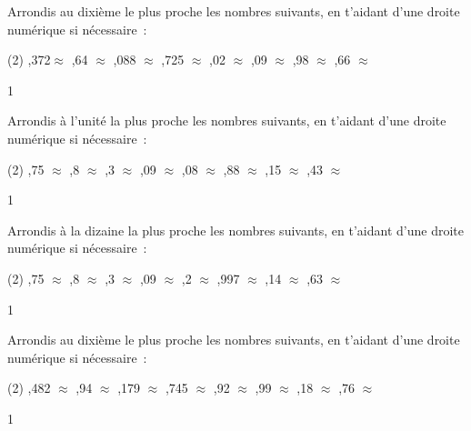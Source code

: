 \documentclass[a4paper,11pt]{report}
\begin{document}
\begin{exop}{
Arrondis au dixième le plus proche les nombres suivants, en t'aidant d'une droite numérique si nécessaire~:
\begin{tasks}[after-item-skip = 0.2em, after-skip=-1.5em](2)
\bigskip{},372$\approx$ \hrulefill 
\bigskip{},64 $\approx$\hrulefill 
\bigskip{},088 $\approx$\hrulefill 
\bigskip{},725 $\approx$ \hrulefill 
\bigskip{},02 $\approx$ \hrulefill
\bigskip{},09 $\approx$ \hrulefill 
\bigskip{},98 $\approx$ \hrulefill 
\bigskip{},66 $\approx$ \hrulefill 
\end{tasks}
}{1}\end{exop}


\begin{exop}{
Arrondis à l'unité la plus proche les nombres suivants, en t'aidant d'une droite numérique si nécessaire~:
\begin{tasks}[after-item-skip = 0.2em, after-skip=-1.5em](2)
\bigskip{},75 $\approx$\hrulefill  
\bigskip{},8 $\approx$ \hrulefill  
\bigskip{},3 $\approx$ \hrulefill  
\bigskip{},09 $\approx$\hrulefill  
\bigskip{},08 $\approx$\hrulefill  
\bigskip{},88 $\approx$\hrulefill  
\bigskip{},15 $\approx$\hrulefill  
\bigskip{},43 $\approx$ \hrulefill  
\end{tasks}
}{1}\end{exop}

\begin{exop}{
Arrondis à la dizaine  la plus proche les nombres suivants, en t'aidant d'une droite numérique si nécessaire~:
\begin{tasks}[after-item-skip = 0.2em, after-skip=-1.5em](2)
\bigskip{},75 $\approx$ \hrulefill  
\bigskip{},8 $\approx$ \hrulefill  
\bigskip{},3 $\approx$ \hrulefill  
\bigskip{},09 $\approx$ \hrulefill  
\bigskip{},2 $\approx$ \hrulefill  
\bigskip{},997 $\approx$ \hrulefill  
\bigskip{},14 $\approx$\hrulefill  
\bigskip{},63 $\approx$\hrulefill  
\end{tasks}
}{1}\end{exop}

\begin{exop}{
Arrondis au dixième le plus proche les nombres suivants, en t'aidant d'une droite numérique si nécessaire~:
\begin{tasks}(2)
\bigskip{},482 $\approx$ \hrulefill  
\bigskip{},94 $\approx$\hrulefill  
\bigskip{},179 $\approx$\hrulefill  
\bigskip{},745 $\approx$ \hrulefill  
\bigskip{},92 $\approx$ \hrulefill  
\bigskip{},99 $\approx$ \hrulefill  
\bigskip{},18 $\approx$ \hrulefill  
\bigskip{},76 $\approx$ \hrulefill  
\end{tasks}
}{1}\end{exop}
\end{document}
